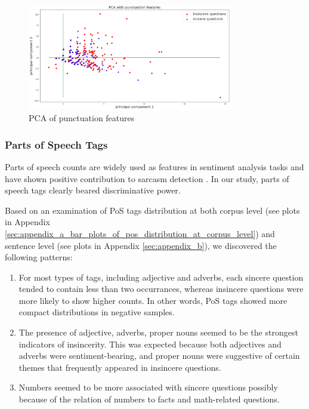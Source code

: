 \documentclass[12pt]{diazessay} %
\begin{document}
\begin{figure}[ht]
    \includegraphics[width=0.8\textwidth, center]{graphs/pca/2Dpunc.png}
    
    \medskip
    \small
    \caption{PCA of punctuation features} 
    \label{figure:puncpca}
\end{figure}


\subsubsection{Parts of Speech Tags} %
\label{ssub:parts_of_speech_tags}

Parts of speech counts are widely used as features in sentiment analysis tasks \citep{medhat2014} and have shown positive contribution to sarcasm detection \citep{barbosa2010}. In our study, parts of speech tags clearly beared discriminative power. 

Based on an examination of PoS tags distribution at both corpus level (see plots in Appendix \ref{sec:appendix_a_bar_plots_of_pos_distribution_at_corpus_level}) and sentence level (see plots in Appendix \ref{sec:appendix_b}), we discovered the following patterns: 

\begin{enumerate}
    \item For most types of tags, including adjective and adverbs, each sincere question tended to contain less than two occurrances, whereas insincere questions were more likely to show higher counts. In other words, PoS tags showed more compact distributions in negative samples. 
    \item The presence of adjective, adverbs, proper nouns seemed to be the strongest indicators of insincerity. This was expected because both adjectives and adverbs were sentiment-bearing, and proper nouns were suggestive of certain themes that frequently appeared in insincere questions. 
    \item Numbers seemed to be more associated with sincere questions possibly because of the relation of numbers to facts and math-related questions. 
\end{enumerate}
\end{document}
